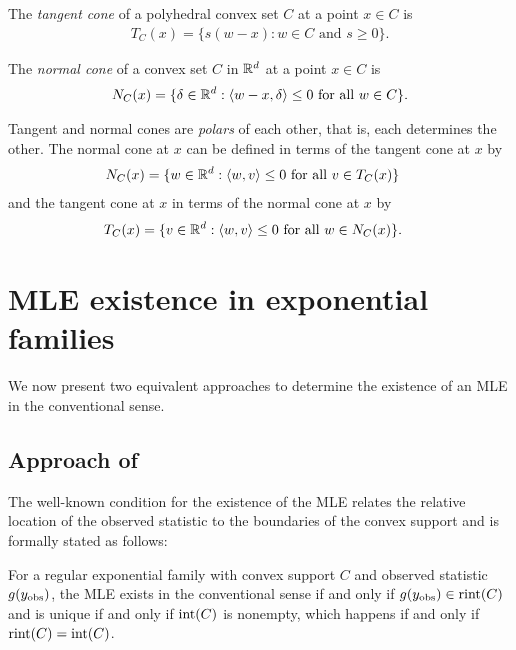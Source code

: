 The \emph{tangent cone} of a polyhedral convex set $C$ at a point $x \in C$ is
\begin{align*}
	T_C(x) = \{s(w-x):w \in C \text{ and } s \geq 0 \}.
\end{align*}


The \emph{normal cone} of a convex set $C$ in ${\mathbb R}^d$ at a point $x \in C$ is 
\begin{align*}
	N_C(x) = \{ \delta \in {\mathbb R}^d: \langle w-x,\delta \rangle \leq 0 \text{ for all } w \in C 
\}.
\end{align*}

Tangent and normal cones are \emph{polars} of each other, that is, each determines the other.  
The normal cone at $x$ can be defined in terms of the tangent cone at $x$ by
\begin{align*}
	N_C(x) 	&= \{ w \in {\mathbb R}^d: \langle  w, v  \rangle \leq 0 \text{ for all } v \in T_C(x) \} 
\end{align*}
and the tangent cone at $x$ in terms of the normal cone at $x$ by
\begin{align*}
	T_C(x) 	&= \{ v \in {\mathbb R}^d: \langle  w, v  \rangle \leq 0 \text{ for all } w \in N_C(x) \}.
\end{align*}




\section{MLE existence in exponential families}
We now present two equivalent approaches to determine the existence of an MLE
in the conventional sense.  

\subsection{Approach of \citet{Barndorff}}
The well-known condition for the existence of the MLE \citep{Barndorff, Brown:1986} 
relates the relative location of the observed statistic to the boundaries of 
the convex support and is formally stated as follows:
\begin{theorem} \label{Thm:MLE rint}
For a regular exponential family with convex support $C$ and observed statistic $g(y_{\text{obs}})$, the MLE exists in the conventional sense if and only if 
$g(y_{\text{obs}}) \in \operatorname{rint}(C)$ and is unique if and only if $\operatorname{int}(C)$ is nonempty, which
happens if and only if $\operatorname{rint}(C) = \operatorname{int}(C)$. 
\end{theorem}

